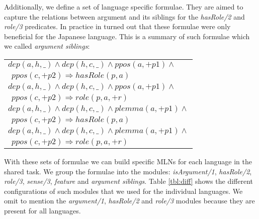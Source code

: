 Additionally, we define a set of language specific formulae. They are aimed to 
capture the relations between argument and its siblings for the \emph{hasRole/2} 
and \emph{role/3} predicates.  In practice in turned out that these formulae were only beneficial for 
the Japanese language.  This is a summary of such formulae which we called 
\emph{argument siblings}:
\begin{tabular}{p{7.5cm}}
   $ dep(a,h,\_) \land dep(h,c,\_) \land ppos(a,+p1) \land $\\$\ \ ppos(c,+p2) 
   \Rightarrow hasRole(p,a)    $\\
   $ dep(a,h,\_) \land dep(h,c,\_) \land ppos(a,+p1) \land $\\$\ \ ppos(c,+p2) 
   \Rightarrow role(p,a,+r)    $\\
   $ dep(a,h,\_) \land dep(h,c,\_) \land plemma(a,+p1) \land $\\$\ \ ppos(c,+p2) 
   \Rightarrow hasRole(p,a)    $\\
   $ dep(a,h,\_) \land dep(h,c,\_) \land plemma(a,+p1) \land $\\$\ \ ppos(c,+p2) 
   \Rightarrow role(p,a,+r)    $\\
\end{tabular}


With these sets of formulae we can build specific MLNs for each language in the 
shared task. We group the formulae into the modules: \emph{isArgument/1}, 
\emph{hasRole/2}, \emph{role/3}, \emph{sense/3}, \emph{feature} and 
\emph{argument siblings}.  Table \ref{tbl:diff} shows the different 
configurations of such modules that we used for the individual languages.  We 
omit to mention the \emph{argument/1}, \emph{hasRole/2} and \emph{role/3} 
modules because they are present for all languages. 


